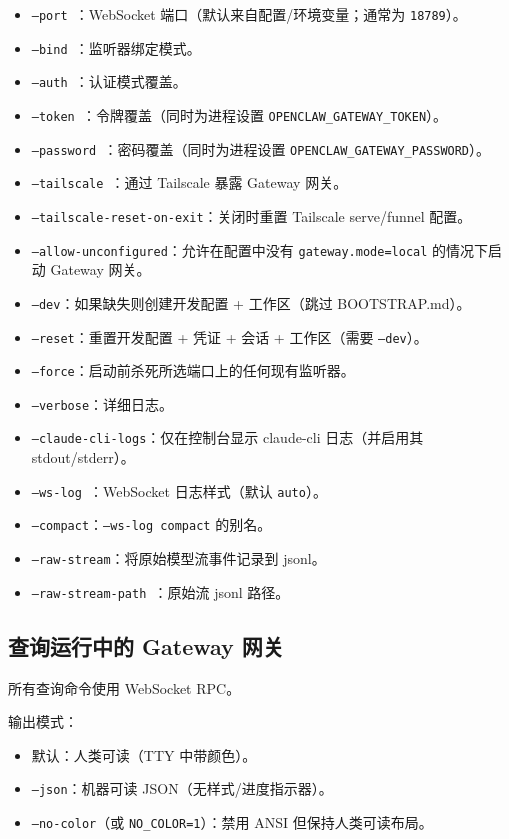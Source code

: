 \begin{itemize}
  \item \texttt{--port }：WebSocket 端口（默认来自配置/环境变量；通常为 \texttt{18789}）。
  \item \texttt{--bind }：监听器绑定模式。
  \item \texttt{--auth }：认证模式覆盖。
  \item \texttt{--token }：令牌覆盖（同时为进程设置 \texttt{OPENCLAW\_GATEWAY\_TOKEN}）。
  \item \texttt{--password }：密码覆盖（同时为进程设置 \texttt{OPENCLAW\_GATEWAY\_PASSWORD}）。
  \item \texttt{--tailscale }：通过 Tailscale 暴露 Gateway 网关。
  \item \texttt{--tailscale-reset-on-exit}：关闭时重置 Tailscale serve/funnel 配置。
  \item \texttt{--allow-unconfigured}：允许在配置中没有 \texttt{gateway.mode=local} 的情况下启动 Gateway 网关。
  \item \texttt{--dev}：如果缺失则创建开发配置 + 工作区（跳过 BOOTSTRAP.md）。
  \item \texttt{--reset}：重置开发配置 + 凭证 + 会话 + 工作区（需要 \texttt{--dev}）。
  \item \texttt{--force}：启动前杀死所选端口上的任何现有监听器。
  \item \texttt{--verbose}：详细日志。
  \item \texttt{--claude-cli-logs}：仅在控制台显示 claude-cli 日志（并启用其 stdout/stderr）。
  \item \texttt{--ws-log }：WebSocket 日志样式（默认 \texttt{auto}）。
  \item \texttt{--compact}：\texttt{--ws-log compact} 的别名。
  \item \texttt{--raw-stream}：将原始模型流事件记录到 jsonl。
  \item \texttt{--raw-stream-path }：原始流 jsonl 路径。
\end{itemize}


\subsection{查询运行中的 Gateway 网关}


所有查询命令使用 WebSocket RPC。

输出模式：

\begin{itemize}
  \item 默认：人类可读（TTY 中带颜色）。
  \item \texttt{--json}：机器可读 JSON（无样式/进度指示器）。
  \item \texttt{--no-color}（或 \texttt{NO\_COLOR=1}）：禁用 ANSI 但保持人类可读布局。
\end{itemize}


